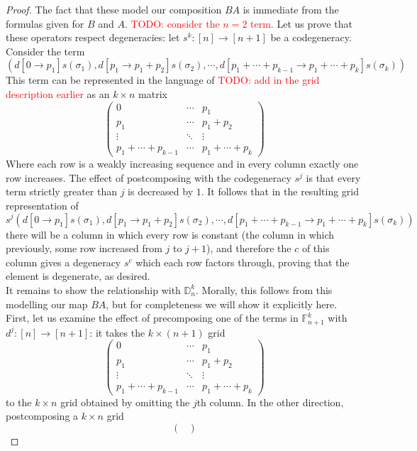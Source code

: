 \documentclass[12pt]{article}
\theoremstyle{definition}
\newcommand{\TODO}[1]{\textcolor{red}{TODO: {#1}}}
\begin{document}
\begin{proof}
	The fact that these model our composition $BA$ is immediate from the formulas given for $B$ and $A$.  \TODO{consider the $n=2$ term.}
	Let us prove that these operators respect degeneracies: let $s^k : [n] \to [n+1]$ be a codegeneracy. Consider the term
	$$ \left( d[0\to p_1] s(\sigma_1), d[p_1 \to p_1 + p_2] s(\sigma_2), \cdots , d[p_1 + \cdots + p_{k-1} \to p_1 + \cdots + p_k] s(\sigma_k)  \right)$$
	This term can be represented in the language of \TODO{add in the grid description earlier} as an $k\times n$ matrix 
	$$
		\begin{pmatrix}
			0 & \cdots & p_1 \\
			p_1 & \cdots & p_1 + p_2 \\
			\vdots & \ddots & \vdots \\
			p_1 + \cdots + p_{k-1} & \cdots & p_1 + \cdots + p_k
		\end{pmatrix}
	$$
	Where each row is a weakly increasing sequence and in every column exactly one row increases. The effect of postcomposing with the codegeneracy $s^j$ is that every term strictly greater than $j$ is decreased by $1$. It follows that in the resulting grid representation of 
	$$ s^j \left( d[0\to p_1] s(\sigma_1), d[p_1 \to p_1 + p_2] s(\sigma_2), \cdots , d[p_1 + \cdots + p_{k-1} \to p_1 + \cdots + p_k] s(\sigma_k)  \right)$$ 
	there will be a column in which every row is constant (the column in which previously, some row increased from $j$ to $j+1$), and therefore the $c$ of this column gives a degeneracy $s^c$ which each row factors through, proving that the element is degenerate, as desired.  
	\\
	\indent It remains to show the relationship with $\mathds{D}^k_n$. Morally, this follows from this modelling our map $BA$, but for completeness we will show it explicitly here. First, let us examine the effect of precomposing one of the terms in $\mathbb{F}^k_{n+1}$ with $d^j:[n] \to [n+1]$: it takes the $k \times (n+1)$ grid
	$$
		\begin{pmatrix}
			0 & \cdots & p_1 \\
			p_1 & \cdots & p_1 + p_2 \\
			\vdots & \ddots & \vdots \\
			p_1 + \cdots + p_{k-1} & \cdots & p_1 + \cdots + p_k
		\end{pmatrix}
	$$
	to the $k \times n$ grid obtained by omitting the $j$th column. In the other direction, postcomposing a $k \times n$ grid
	$$
		\begin{pmatrix}

\end{pmatrix}$$
\end{proof}
\end{document}
